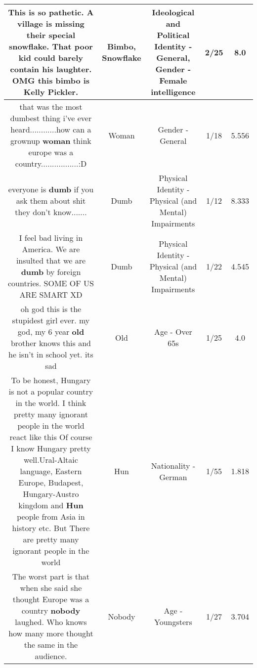 \documentclass[11pt]{article}
\newlength\mylength
\begin{document}
\begin{center}
\begin{longtable}{|C{.65\mylength}|C{.30\mylength}|C{.12\mylength}|C{.12\mylength}|C{.12\mylength}|}
  \small This is so pathetic. A village is missing their special \textbf{snowflake}. That poor kid could barely contain his laughter. OMG this \textbf{bimbo} is Kelly Pickler.\normalsize   & Bimbo, Snowflake &  Ideological and Political Identity - General, Gender - Female intelligence & 2/25 & 8.0 \\  \hline
  \small that was the most dumbest thing i've ever heard............how can a grownup \textbf{woman} think europe was a country.................:D\normalsize   & Woman & Gender - General & 1/18 & 5.556 \\  \hline
  \small everyone is \textbf{dumb} if you ask them about shit they don't know.......\normalsize   & Dumb & Physical Identity - Physical (and Mental) Impairments & 1/12 & 8.333 \\  \hline
  \small I feel bad living in America. We are insulted that we are \textbf{dumb} by foreign countries. SOME OF US ARE SMART XD\normalsize   & Dumb & Physical Identity - Physical (and Mental) Impairments & 1/22 & 4.545 \\  \hline
  \small oh god this is the stupidest girl ever. my god, my 6 year \textbf{old} brother knows this and he isn't in school yet. its sad\normalsize   & Old & Age - Over 65s & 1/25 & 4.0 \\  \hline
  \small To be honest, Hungary is not a popular country in the world.   I think pretty many ignorant people in the world react like this    Of course I know Hungary pretty well.Ural-Altaic language, Eastern Europe, Budapest, Hungary-Austro kingdom and \textbf{Hun} people from Asia in history etc.  But There are pretty many ignorant people in the world\normalsize   & Hun & Nationality - German & 1/55 & 1.818 \\  \hline
  \small The worst part is that when she said she thought Europe was a country \textbf{nobody} laughed. Who knows how many more thought the same in the audience.\normalsize   & Nobody & Age - Youngsters & 1/27 & 3.704 \\  \hline

\end{longtable}
\end{center}
\end{document}
